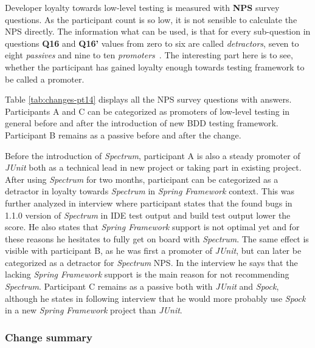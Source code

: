 Developer loyalty towards low-level testing is measured with \textbf{NPS} survey questions. As the participant count is so low, it is not
sensible to calculate the NPS \noindent directly. The information what can be used, is that for every sub-question in questions
\textbf{Q16} and \textbf{Q16'} values from zero to six are called \textit{detractors}, seven to eight \textit{passives} and
nine to ten \textit{promoters}~\cite{reichheld2003one}. The interesting part here is to see,
whether the participant has gained loyalty enough
towards testing framework to be called a promoter.


Table \ref{tab:changes-pt14} displays all the NPS survey questions with answers.
Participants A and C can be categorized as promoters of low-level testing
in general before and after the introduction of new BDD testing framework. Participant B remains as a
passive before and after the change.

Before the introduction of \textit{Spectrum}, participant A
is also a steady promoter of \textit{JUnit} both as a technical lead in new project or taking part in existing project. After
using \textit{Spectrum} for two months, participant can be categorized as a detractor in loyalty towards \textit{Spectrum} in \textit{Spring Framework} context.
This was further
analyzed in interview where participant states that the found bugs in 1.1.0 version of \textit{Spectrum} in IDE test output and build test output
lower the score. He also states that \textit{Spring Framework} support is not optimal yet and for these reasons he hesitates
to fully get on board with \textit{Spectrum}.
The same effect is visible with participant B, as he was first a promoter of \textit{JUnit}, but can later be categorized as a detractor for \textit{Spectrum} NPS.
In the interview he says that the lacking \textit{Spring Framework} support is the main reason for not recommending \textit{Spectrum}.
Participant C remains as a passive both with \textit{JUnit} and \textit{Spock}, although he states in following interview that he would more
probably use \textit{Spock} in a new \textit{Spring Framework} project than \textit{JUnit}.

\subsubsection{Change summary}

